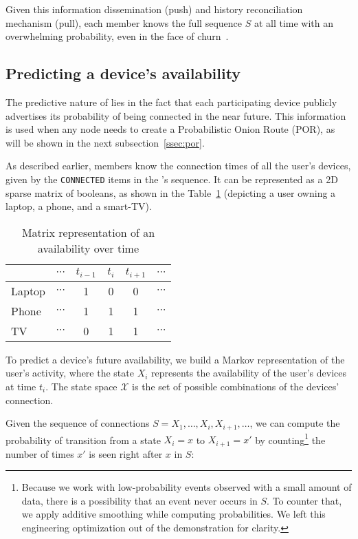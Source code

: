 Given this information dissemination (push) and history reconciliation mechanism (pull), each \squad member knows the full sequence $S$ at all time with an overwhelming probability, even in the face of churn~\cite{luxey:cascade}.

\subsection{Predicting a device's availability}
\label{ssec:device_availability}

The predictive nature of \name lies in the fact that each participating device publicly advertises its probability of being connected in the near future. 
This information is used when any node needs to create a Probabilistic Onion Route (POR), as will be shown in the next subsection~\ref{ssec:por}.

As described earlier, \squad members know the connection times of all the user's devices, given by the \texttt{CONNECTED} items in the \squad's sequence.
It can be represented as a 2D sparse matrix of booleans, as shown in the Table~\ref{tab:connection_times} (depicting a user owning a laptop, a phone, and a smart-TV).


\begin{table}
\caption{Matrix representation of an \squad availability over time}
\centering
\begin{tabular}{@{}lccccc@{}} \toprule
		& $\cdots$	& $t_{i-1}$	& $t_i$		& $t_{i+1}$	& $\cdots$ \\ \midrule
Laptop	& $\cdots$	& 1			& 0			& 0			& $\cdots$ \\
Phone	& $\cdots$	& 1			& 1			& 1			& $\cdots$ \\
TV		& $\cdots$	& 0			& 1			& 1			& $\cdots$ \\ \bottomrule
\end{tabular}
\label{tab:connection_times}
\end{table}

To predict a device's future availability, we build a Markov representation of the user's activity, 
where the state $X_i$ represents the availability of the user's devices at time $t_i$.
The state space $\mathcal{X}$ is the set of possible combinations of the devices' connection.

Given the \squad sequence of connections $S = X_1, \dots, X_i, X_{i+1}, \dots$,
we can compute the probability of transition from a state $X_i=x$ to $X_{i+1}=x'$ by counting\footnote{%
	Because we work with low-probability events observed with a small amount of data, there is a possibility that an event never occurs in $S$. 
	To counter that, we apply additive smoothing while computing probabilities. 
	We left this engineering optimization out of the demonstration for clarity.
} the number of times $x'$ is seen right after $x$ in $S$:

